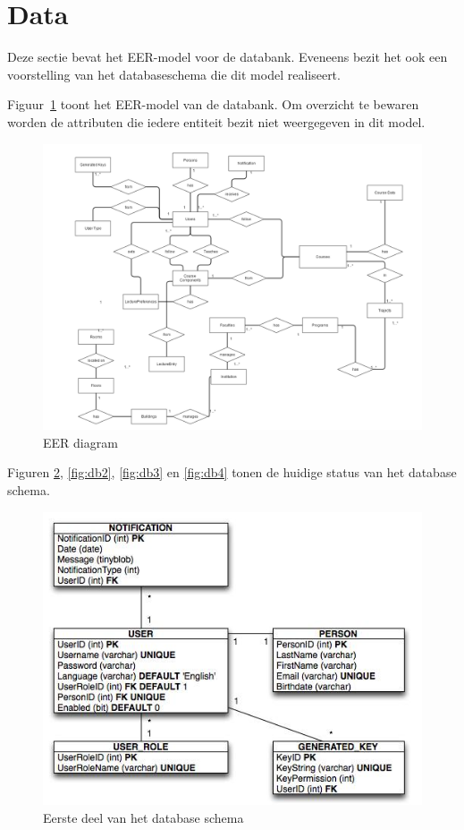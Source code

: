 \section{Data}
\label{sec:data}
Deze sectie bevat het EER-model voor de databank.
Eveneens bezit het ook een voorstelling van het databaseschema die dit model realiseert.

Figuur~\ref{fig:EER diagram} toont het EER-model van de databank. Om overzicht te bewaren worden de attributen die iedere entiteit bezit niet weergegeven in dit model.

\begin{figure}[H]
	\centering
	\includegraphics[scale=0.4]{img/ER4-gliffy}
	\caption{EER diagram}
	\label{fig:EER diagram}
\end{figure}

Figuren \ref{fig:db1}, \ref{fig:db2}, \ref{fig:db3} en \ref{fig:db4} tonen de huidige status van het database schema.

\begin{figure}[H]
	\centering
	\includegraphics[scale=0.5]{design/EER/design1}
	\caption{Eerste deel van het database schema}
	\label{fig:db1}
\end{figure}

